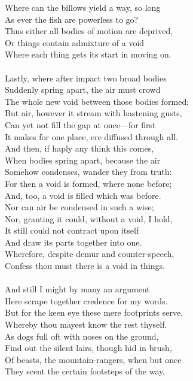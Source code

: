 Where can the billows yield a way, so long\\
As ever the fish are powerless to go?\\
Thus either all bodies of motion are deprived,\\
Or things contain admixture of a void\\
Where each thing gets its start in moving on.\\
\\
Lastly, where after impact two broad bodies\\
Suddenly spring apart, the air must crowd\\
The whole new void between those bodies formed;\\
But air, however it stream with hastening gusts,\\
Can yet not fill the gap at once—for first\\
It makes for one place, ere diffused through all.\\
And then, if haply any think this comes,\\
When bodies spring apart, because the air\\
Somehow condenses, wander they from truth:\\
For then a void is formed, where none before;\\
And, too, a void is filled which was before.\\
Nor can air be condensed in such a wise;\\
Nor, granting it could, without a void, I hold,\\
It still could not contract upon itself\\
And draw its parts together into one.\\
Wherefore, despite demur and counter-speech,\\
Confess thou must there is a void in things.\\
\\
And still I might by many an argument\\
Here scrape together credence for my words.\\
But for the keen eye these mere footprints serve,\\
Whereby thou mayest know the rest thyself.\\
As dogs full oft with noses on the ground,\\
Find out the silent lairs, though hid in brush,\\
Of beasts, the mountain-rangers, when but once\\
They scent the certain footsteps of the way,\\
